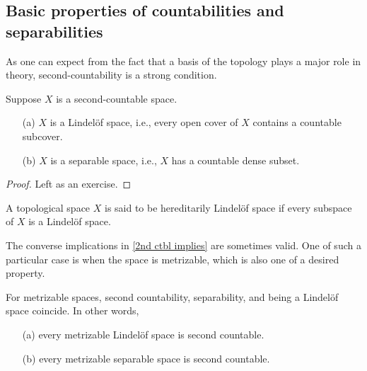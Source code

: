 \subsection{Basic properties of countabilities and separabilities}
As one can expect from the fact that a basis of the topology plays a major role in theory, second-countability is a strong condition.
\begin{prop}\label{2nd ctbl implies}
    Suppose $X$ is a second-countable space.
    \begin{enumerate}
        \item[(a)]
        {
            $X$ is a Lindel\"of space, i.e., every open cover of $X$ contains a countable subcover.
        }
        \item[(b)]
        {
            $X$ is a separable space, i.e., $X$ has a countable dense subset.
        }
    \end{enumerate}
\end{prop}
\begin{proof}
    \color{brown}Left as an exercise.\color{black}
\end{proof}
\begin{rmk}
    A topological space $X$ is said to be hereditarily Lindel\"of space if every subspace of $X$ is a Lindel\"of space.
\end{rmk}
The converse implications in \cref{2nd ctbl implies} are sometimes valid.
One of such a particular case is when the space is metrizable, which is also one of a desired property.
\begin{prop}
    For metrizable spaces, second countability, separability, and being a Lindel\"{o}f space coincide.
    In other words,
    \begin{enumerate}
        \item[(a)]
        {
            every metrizable Lindel\"{o}f space is second countable.
        }
        \item[(b)]
        {
            every metrizable separable space is second countable.
        }
    \end{enumerate}
\end{prop}
